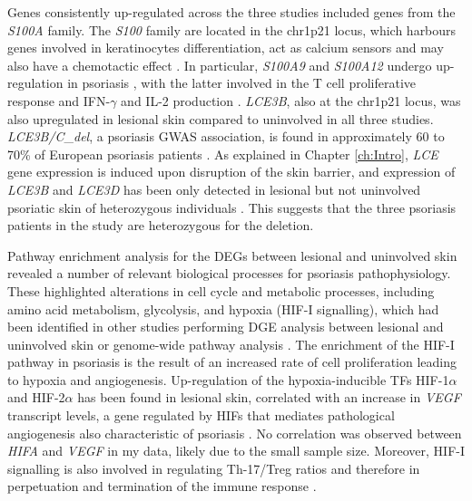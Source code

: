 Genes consistently up-regulated across the three studies included genes from the \textit{S100A} family. The \textit{S100} family are located in the chr1p21 locus, which harbours genes involved in keratinocytes differentiation, act as calcium sensors and may also have a chemotactic effect \parencite{Eckert2004}. In particular, \textit{S100A9} and \textit{S100A12} undergo up-regulation in psoriasis \parencite{Broome2003}, with the latter involved in the T cell proliferative response and IFN-$\gamma$ and IL-2 production \parencite{Moser2007}.  \textit{LCE3B}, also at the chr1p21 locus, was also upregulated in lesional skin compared to uninvolved in all three studies. \textit{LCE3B/C}\_\textit{del}, a psoriasis GWAS association, is found in approximately 60 to 70\% of European psoriasis patients \parencite{Cid2009}. As explained in Chapter \ref{ch:Intro}, \textit{LCE} gene expression is induced upon disruption of the skin barrier, and expression of \textit{LCE3B} and \textit{LCE3D} has been only detected in lesional but not uninvolved psoriatic skin of heterozygous individuals \parencite{Cid2009,Bergboer2011}. This suggests that the three psoriasis patients in the study are heterozygous for the deletion.


Pathway enrichment analysis for the DEGs between lesional and uninvolved skin revealed a number of relevant biological processes for psoriasis pathophysiology. These highlighted alterations in cell cycle and metabolic processes, including amino acid metabolism, glycolysis, and hypoxia (HIF-I signalling), which had been identified in other studies performing DGE analysis between lesional and uninvolved skin or genome-wide pathway analysis \parencite{Coda2012, Gudjonsson2010,Aterido2016, Tervaniemi2016}. The enrichment of the HIF-I pathway in psoriasis is the result of an increased rate of cell proliferation leading to hypoxia and angiogenesis.  Up-regulation of the hypoxia-inducible TFs HIF-1$\alpha$ and HIF-2$\alpha$ has been found in lesional skin, correlated with an increase in \textit{VEGF} transcript levels, a gene regulated by HIFs that mediates pathological angiogenesis also characteristic of psoriasis \parencite{Rosenberg2007}. No correlation was observed between \textit{HIFA} and \textit{VEGF} in my data, likely due to the small sample size. Moreover, HIF-I signalling is also involved in regulating Th-17/Treg ratios and therefore in perpetuation and termination of the immune response \parencite{Dang2013}. 

